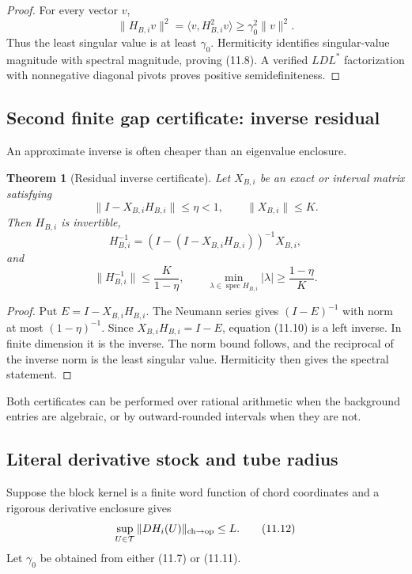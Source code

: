 \documentclass[11pt]{article}
\newtheorem{theorem}{Theorem}[section]
\newcommand{\spec}{\operatorname{spec}}
\begin{document}
\begin{proof}
For every vector \(v\),
\[
 \|H_{B,i}v\|^2
 =
 \langle v,H_{B,i}^2v\rangle
 \geq\gamma_0^2\|v\|^2.
\]
Thus the least singular value is at least \(\gamma_0\).  Hermiticity
identifies singular-value magnitude with spectral magnitude, proving
(11.8).  A verified \(LDL^*\) factorization with nonnegative diagonal
pivots proves positive semidefiniteness.
\end{proof}

\subsection{Second finite gap certificate: inverse residual}

An approximate inverse is often cheaper than an eigenvalue enclosure.

\begin{theorem}[Residual inverse certificate]
\label{thm:v11v11-residual-gap}
Let \(X_{B,i}\) be an exact or interval matrix satisfying
\[
 \|I-X_{B,i}H_{B,i}\|\leq\eta<1,
 \qquad
 \|X_{B,i}\|\leq K.
 \tag{11.9}
\]
Then \(H_{B,i}\) is invertible,
\[
 H_{B,i}^{-1}=(I-(I-X_{B,i}H_{B,i}))^{-1}X_{B,i},
 \tag{11.10}
\]
and
\[
 \|H_{B,i}^{-1}\|\leq\frac{K}{1-\eta},
 \qquad
 \min_{\lambda\in\spec H_{B,i}}|\lambda|
 \geq\frac{1-\eta}{K}.
 \tag{11.11}
\]
\end{theorem}

\begin{proof}
Put \(E=I-X_{B,i}H_{B,i}\).  The Neumann series gives
\((I-E)^{-1}\) with norm at most \((1-\eta)^{-1}\).
Since \(X_{B,i}H_{B,i}=I-E\), equation (11.10) is a left inverse.
In finite dimension it is the inverse.  The norm bound follows, and the
reciprocal of the inverse norm is the least singular value.  Hermiticity
then gives the spectral statement.
\end{proof}

Both certificates can be performed over rational arithmetic when the
background entries are algebraic, or by outward-rounded intervals when
they are not.

\subsection{Literal derivative stock and tube radius}

Suppose the block kernel is a finite word function of chord coordinates
and a rigorous derivative enclosure gives
\[
 \sup_{U\in\mathcal T}
 \|DH_i(U)\|_{\rm ch\to op}\leq L.
 \tag{11.12}
\]
Let \(\gamma_0\) be obtained from either (11.7) or (11.11).
\end{document}
